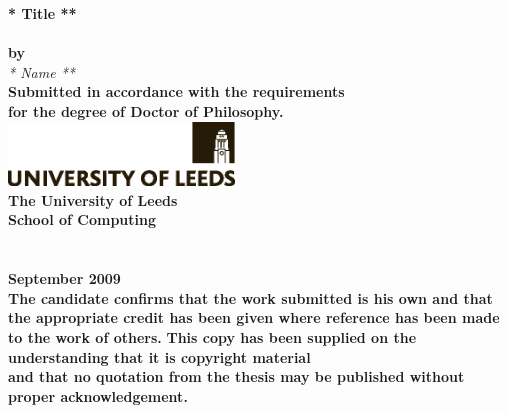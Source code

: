 \pagestyle{empty}
%
%
\begin{center}
\LARGE
{\bf ** Title **} \\
\ \\
\Large
{\bf by} \\
\vspace{0.3in}
\Large
{\it ** Name **} \\
\normalsize
\vspace{1in}
{\bf Submitted in accordance with the requirements \\ for the degree of Doctor
of Philosophy.}\\
\vspace{0.5 in}
\mbox{\includegraphics[width=6cm]{Leeds_pmsBLACK.eps} }  \\
{\bf The University of Leeds \\
   School of Computing} \\
\ \\
\ \\
\vspace{0.2in}
{\bf September 2009} \\

\vspace{0.6in}
{\bf The candidate confirms that the work submitted is his own and that the appropriate credit has been given where reference has been made to the work of others.}
\vspace{0.2in}
{\bf This copy has been supplied on the understanding that it is copyright material\\
and that no quotation from the thesis may be published without proper acknowledgement.}

\end{center}
%

\newpage

